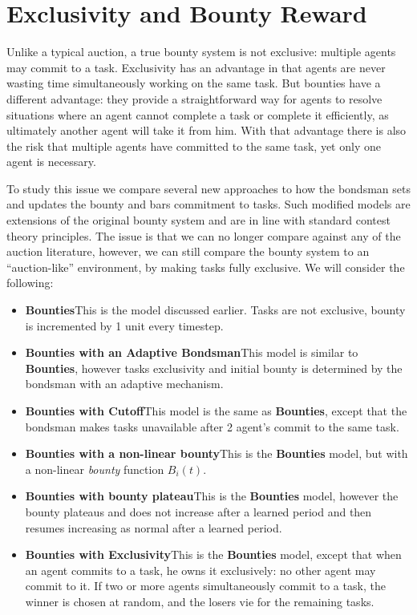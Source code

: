 \documentclass[letterpaper]{aamas2015}
\begin{document}
\section{Exclusivity and Bounty Reward}

Unlike a typical auction, a true bounty system is not exclusive: multiple agents may commit to a task.  Exclusivity has an advantage in that agents are never wasting time simultaneously working on the same task.  But bounties have a different advantage: they provide a straightforward way for agents to resolve situations where an agent cannot complete a task or complete it efficiently, as  ultimately another agent will take it from him.  With that advantage there is also the risk that multiple agents have committed to the same task, yet only one agent is necessary.  

To study this issue we compare several new approaches to how the bondsman sets and updates the bounty and bars commitment to tasks.  Such modified models are extensions of the original bounty system and are in line with standard contest theory principles.  The issue is that we can no longer compare against any of the auction literature, however, we can still compare the bounty system to an ``auction-like'' environment, by making tasks fully exclusive.  We will consider the following: 

\begin{itemize}
\item {\bf Bounties}\quad This is the model discussed earlier.  Tasks are not exclusive, bounty is incremented by 1 unit every timestep.
\item {\bf Bounties with an Adaptive Bondsman}\quad This model is similar to {\bf Bounties}, however tasks exclusivity and initial bounty is determined by the bondsman with an adaptive mechanism.
\item {\bf Bounties with Cutoff}\quad This model is the same as {\bf Bounties}, except that the bondsman makes tasks unavailable after 2 agent's commit to the same task.  
\item {\bf Bounties with a non-linear bounty}\quad This is the {\bf Bounties} model, but with a non-linear {\it bounty} function \(B_{i}(t)\).
\item {\bf Bounties with bounty plateau}\quad This is the {\bf Bounties} model, however the bounty plateaus and does not increase after a learned period and then resumes increasing as normal after a learned period.
\item {\bf Bounties with Exclusivity}\quad This is the {\bf Bounties} model, except that when an agent commits to a task, he owns it exclusively: no other agent may commit to it.  If two or more agents simultaneously commit to a task, the winner is chosen at random, and the losers vie for the remaining tasks.
\end{itemize}
\end{document}
